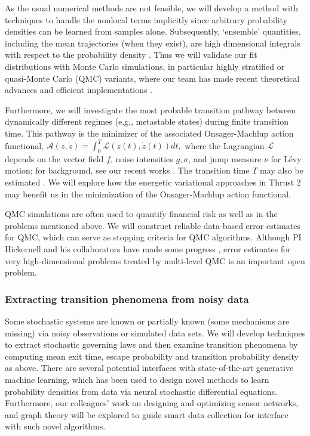 \documentclass[11pt]{NSFamsart}
\begin{document}
As the usual numerical methods  are not feasible, we will develop a method with techniques to handle the nonlocal terms implicitly since arbitrary probability densities can be learned from samples alone. Subsequently, `ensemble' quantities, including the mean trajectories (when they exist), are high dimensional integrals with respect to the probability density \cite{DuanBook2015}.  Thus we will validate our fit distributions with Monte Carlo simulations, in particular highly stratified or quasi-Monte Carlo (QMC) variants, where our team has made recent theoretical advances \cite{Hic17a, HicEtal17a} and efficient implementations \cite{QMCPy2020a,ChoEtal22a}.

Furthermore, we will investigate the most probable transition pathway between dynamically different regimes (e.g., metastable states) during finite transition time. This pathway is the minimizer of the associated Onsager-Machlup action functional, $\mathcal{A}(z, \dot z) = \int_0^T \mathcal{L}(z(t), \dot z(t)) dt,$ where the Lagrangian  $\mathcal{L}$ depends on the vector field $f$, noise intensities $g, \sigma$, and  jump measure $\nu$ for L\'evy motion; for background, see   our recent works \cite{ChaoDuanOM,HuangYF}. The   transition time $T$ may also be estimated \cite{HuangYF2020}. We will explore how the energetic variational approaches in Thrust 2 may benefit us in the minimization of the Onsager-Machlup action functional. 

QMC simulations are often used to quantify financial risk as well as in the problems mentioned above.  We will construct reliable data-based error estimates for QMC, which can serve as stopping criteria for QMC algorithms.  Although PI Hickernell and his collaborators have made some progress \cite{HicJim16a,JimHic16a,HicEtal17a,RatHic19a,JagHic22a}, error estimates for very high-dimensional problems treated by multi-level QMC is an important open problem.

\subsubsection*{Extracting transition phenomena from noisy data}
Some   stochastic systems are known or partially known (some mechanisms are missing) via noisy observations or simulated data sets. We will  develop techniques to extract stochastic governing laws \cite{Wei2022AnOC, YangLi2020a, Li2022ExtractingGL, Lu2022LearningTT} and then examine transition phenomena by computing mean exit time, escape probability and transition probability density as above. 
There are several potential interfaces with state-of-the-art generative machine learning, which has been used to design novel methods to learn probability densities from data via neural stochastic differential equations. Furthermore, our colleagues'  work on 
designing and optimizing sensor networks, and graph theory \cite{karwa2016statistical,Calines2008MonitoringSF} will be explored to guide smart data collection for interface with such novel algorithms. 
\end{document}
